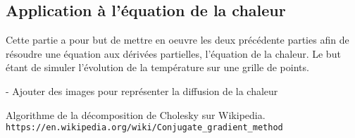 \documentclass{article}
\begin{document}
\subsection*{Application à l’équation de la chaleur}
    Cette partie a pour but de mettre en oeuvre les deux précédente parties afin de résoudre une équation aux dérivées partielles, l'équation de la chaleur. Le but étant de simuler l'évolution de la température sur une grille de points.

- Ajouter des images pour représenter la diffusion de la chaleur

\begin{thebibliography}{9}
Algorithme de la décomposition de Cholesky sur Wikipedia.
\\\texttt{https://en.wikipedia.org/wiki/Conjugate\_gradient\_method}
\end{thebibliography}
\end{document}
